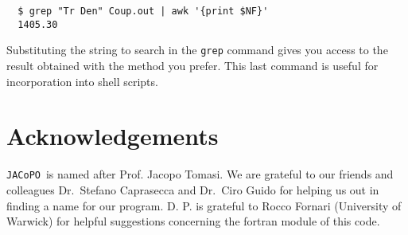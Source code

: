 \documentclass[a4paper]{article}
\newcommand{\jacopo}{\texttt{JACoPO}}
\begin{document}
\begin{verbatim}
  $ grep "Tr Den" Coup.out | awk '{print $NF}'
  1405.30
\end{verbatim}

Substituting the string to search in the \verb|grep| command gives you access to the result obtained with the method you prefer.
This last command is useful for incorporation into shell scripts.

\section*{Acknowledgements}
\jacopo\ is named after Prof. Jacopo Tomasi. We are grateful to our friends and colleagues Dr.~Stefano Caprasecca and Dr.~Ciro Guido for helping us out in finding a name for our program. D. P. is grateful to Rocco Fornari (University of Warwick) for helpful suggestions concerning the fortran module of this code.



\end{document}
